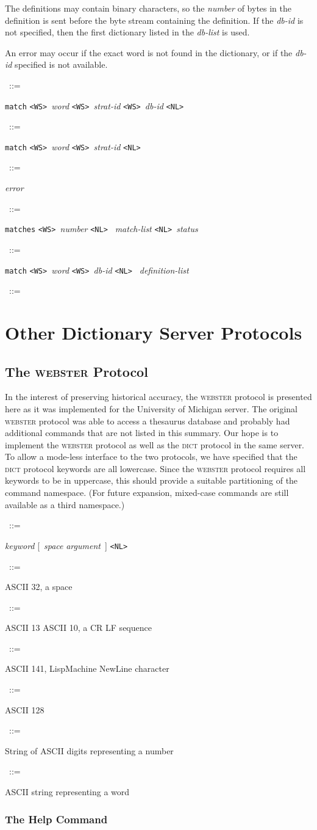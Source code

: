 \documentclass{article}
\newcommand{\WS}{\mbox{\tt <WS>\ }}
\newcommand{\SP}{\mbox{\tt <SP>\ }}
\newcommand{\NL}{\mbox{\tt <NL>\ }}
\newcommand{\EOF}{\mbox{\tt <EOF>\ }}
\newcommand{\note}{\bigskip\par\noindent}
\newcommand{\prd}[3][]{\noindent\begin{leftline}\hspace{1em}{\it #2}\ ::=\ %
  \begin{minipage}[t]{.64\textwidth}\raggedright #3\end{minipage}%
    \ifthenelse{\equal{#1}{}}{}%
    {\begin{minipage}[t]{.54\textwidth}\raggedright #1\end{minipage}%
      \vspace{1ex}}%
    \end{leftline}}
\newcommand{\opt}[1]{[~#1~]}
\newcommand{\lhs}[1]{{\it #1\/}}
\newcommand{\lit}[1]{{\tt #1}}
\newcommand{\dict}{\textsc{dict}\xspace}
\newcommand{\webster}{\textsc{webster}\xspace}
\begin{document}
\note The definitions may contain binary characters, so the \lhs{number} of
bytes in the definition is sent before the byte stream containing the
definition.  If the \lhs{db-id} is not specified, then the first dictionary
listed in the \lhs{db-list} is used.

An error may occur if the exact word is not found in the dictionary, or if
the \lhs{db-id} specified is not available.

\prd{match}{\lit{match} \WS \lhs{word} \WS \lhs{strat-id} \WS \lhs{db-id} \NL}
\prd{match}{\lit{match} \WS \lhs{word} \WS \lhs{strat-id} \NL}
\prd{match-response}{\lhs{error}}
\prd{match-response}{\lit{matches} \WS \lhs{number} \NL
                     \lhs{match-list}
                     \NL \lhs{status}}
\prd{match-list}{\lit{match} \WS \lhs{word} \WS \lhs{db-id} \NL
                 \lhs{definition-list}}
\prd{match-list}{}

\section{Other Dictionary Server Protocols}

\subsection{The \webster Protocol}

In the interest of preserving historical accuracy, the \webster protocol is
presented here as it was implemented for the University of Michigan server.
The original \webster protocol was able to access a thesaurus database and
probably had additional commands that are not listed in this summary.  Our
hope is to implement the \webster protocol as well as the \dict protocol in
the same server.  To allow a mode-less interface to the two protocols, we
have specified that the \dict protocol keywords are all lowercase.  Since
the \webster protocol requires all keywords to be in uppercase, this should
provide a suitable partitioning of the command namespace.  (For future
expansion, mixed-case commands are still available as a third
namespace.)\note

\prd{command}{\lhs{keyword} \opt{\lhs{space} \lhs{argument}} \NL}
\prd{\SP}{ASCII 32, a space}
\prd{\NL}{ASCII 13 ASCII 10, a CR LF sequence}
\prd{\NL}{ASCII 141, LispMachine NewLine character}
\prd{\EOF}{ASCII 128}
\prd{number}{String of ASCII digits representing a number}
\prd{word}{ASCII string representing a word}

\subsubsection{The Help Command}
\end{document}
